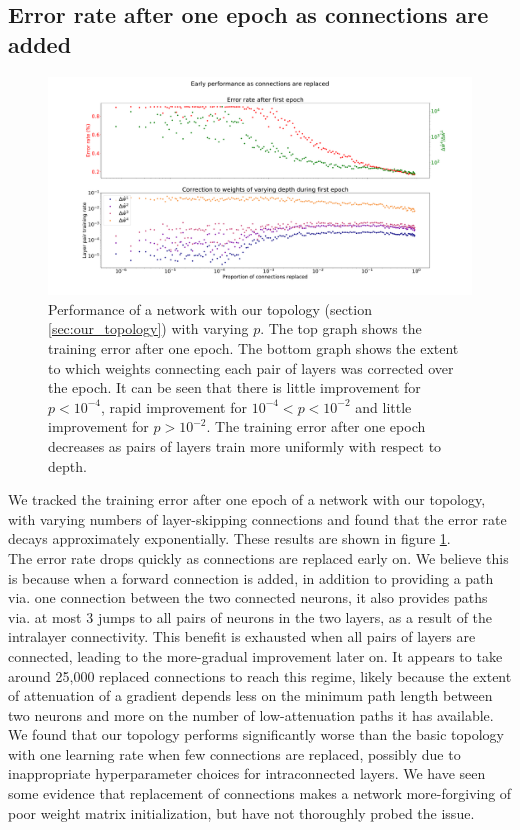 \documentclass[format=sigconf]{acmart}
\newcommand{\npar}{\\\indent}
\begin{document}
\subsection{Error rate after one epoch as connections are added}
\label{sec:mnist_1epoch}

\begin{figure}
  \centering
  \includegraphics[width=\columnwidth]{figures/MNIST_one_epoch_performance.pdf}
  \caption{Performance of a network with our topology (section \ref{sec:our_topology}) with varying $p$. The top graph shows the training error after one epoch. The bottom graph shows the extent to which weights connecting each pair of layers was corrected over the epoch. It can be seen that there is little improvement for $p<10^{-4}$, rapid improvement for $10^{-4}<p<10^{-2}$ and little improvement for $p>10^{-2}$. The training error after one epoch decreases as pairs of layers train more uniformly with respect to depth.}
  \label{fig:mnist_1epoch}
\end{figure}

We tracked the training error after one epoch of a network with our topology, with varying numbers of layer-skipping connections and found that the error rate decays approximately exponentially. These results are shown in figure \ref{fig:mnist_1epoch}.
\npar
The error rate drops quickly as connections are replaced early on. We believe this is because when a forward connection is added, in addition to providing a path via. one connection between the two connected neurons, it also provides paths via. at most 3 jumps to all pairs of neurons in the two layers, as a result of the intralayer connectivity. This benefit is exhausted when all pairs of layers are connected, leading to the more-gradual improvement later on. It appears to take around 25,000 replaced connections to reach this regime, likely because the extent of attenuation of a gradient depends less on the minimum path length between two neurons and more on the number of low-attenuation paths it has available.
\npar
We found that our topology performs significantly worse than the basic topology with one learning rate when few connections are replaced, possibly due to inappropriate hyperparameter choices for intraconnected layers. We have seen some evidence that replacement of connections makes a network more-forgiving of poor weight matrix initialization, but have not thoroughly probed the issue.
\end{document}
